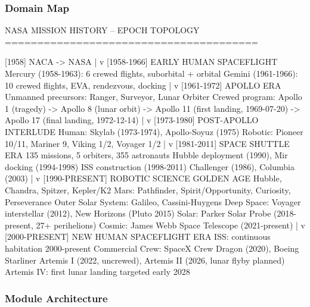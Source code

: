 \documentclass[11pt,letterpaper]{article}
\begin{document}
\subsubsection{Domain Map}

\begin{asciibox}
NASA MISSION HISTORY -- EPOCH TOPOLOGY
=======================================

[1958] NACA -> NASA
   |
   v
[1958-1966] EARLY HUMAN SPACEFLIGHT
   Mercury (1958-1963): 6 crewed flights, suborbital + orbital
   Gemini  (1961-1966): 10 crewed flights, EVA, rendezvous, docking
   |
   v
[1961-1972] APOLLO ERA
   Unmanned precursors: Ranger, Surveyor, Lunar Orbiter
   Crewed program: Apollo 1 (tragedy) -> Apollo 8 (lunar orbit)
                -> Apollo 11 (first landing, 1969-07-20)
                -> Apollo 17 (final landing, 1972-12-14)
   |
   v
[1973-1980] POST-APOLLO INTERLUDE
   Human:  Skylab (1973-1974), Apollo-Soyuz (1975)
   Robotic: Pioneer 10/11, Mariner 9, Viking 1/2, Voyager 1/2
   |
   v
[1981-2011] SPACE SHUTTLE ERA
   135 missions, 5 orbiters, 355 astronauts
   Hubble deployment (1990), Mir docking (1994-1998)
   ISS construction (1998-2011)
   Challenger (1986), Columbia (2003)
   |
   v
[1990-PRESENT] ROBOTIC SCIENCE GOLDEN AGE
   Hubble, Chandra, Spitzer, Kepler/K2
   Mars: Pathfinder, Spirit/Opportunity, Curiosity, Perseverance
   Outer Solar System: Galileo, Cassini-Huygens
   Deep Space: Voyager interstellar (2012), New Horizons (Pluto 2015)
   Solar: Parker Solar Probe (2018-present, 27+ perihelions)
   Cosmic: James Webb Space Telescope (2021-present)
   |
   v
[2000-PRESENT] NEW HUMAN SPACEFLIGHT ERA
   ISS: continuous habitation 2000-present
   Commercial Crew: SpaceX Crew Dragon (2020), Boeing Starliner
   Artemis I (2022, uncrewed), Artemis II (2026, lunar flyby planned)
   Artemis IV: first lunar landing targeted early 2028
\end{asciibox}

\subsubsection{Module Architecture}
\end{document}
